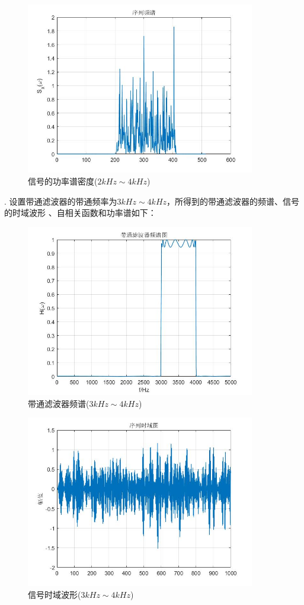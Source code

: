 \documentclass[UTF-8, a4paper, 12pt]{ctexart}
\begin{document}
\begin{figure}[htbp]
    \centering
    \includegraphics[width=10cm]{figs/f2_4.jpg}
    \caption{信号的功率谱密度($2kHz\sim 4kHz$)}
\end{figure}
. 设置带通滤波器的带通频率为$3kHz\sim 4kHz$，所得到的带通滤波器的频谱、信号的时域波形
、自相关函数和功率谱如下：
\begin{figure}[htbp]
    \centering
    \includegraphics[width=10cm]{figs/f31.jpg}
    \caption{带通滤波器频谱($3kHz\sim 4kHz$)}
\end{figure}
\begin{figure}[htbp]
    \centering
    \includegraphics[width=10cm]{figs/f32.jpg}
    \caption{信号时域波形($3kHz\sim 4kHz$)}
    \label{f32}
\end{figure}
\end{document}
